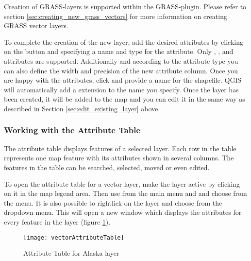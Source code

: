 Creation of GRASS-layers is supported within the GRASS-plugin. Please refer to section
\ref{sec:creating_new_grass_vectors} for more information on creating GRASS vector 
layers.

To complete the creation of the new layer, add the desired attributes by
clicking on the  button and specifying a name and type for the
attribute. Only , , and
 attributes are supported. Additionally and
according to the attribute type you can also define the width and precision
of the new attribute column. Once you are happy with the attributes, click
 and provide a name for the shapefile. QGIS will automatically add
a  extension to the name you specify. Once
the layer has been created, it will be added to the map and you can edit it in
the same way as described in Section \ref{sec:edit_existing_layer} above. 

\subsubsection{Working with the Attribute Table}\label{sec:attribute table}

The attribute table displays features of a selected layer. Each row in the table 
represents one map feature with its attributes shown in several columns. The 
features in the table can be searched, selected, moved or even edited.

To open the attribute table for a vector layer, make the layer active by clicking 
on it in the map legend area. Then use  from the main menu 
and and choose  
from the menu. It is also possible to rightlick on the layer and 
choose  from the 
dropdown menu. This will open a new window which displays the attributes for 
every feature in the layer (figure \ref{fig:attributetable}).

\begin{figure}[ht]
   \begin{center}
   \caption{Attribute Table for Alaska layer \nixcaption}\label{fig:attributetable}\smallskip
   \texttt{[image: vectorAttributeTable]}
\end{center} 
\end{figure}



